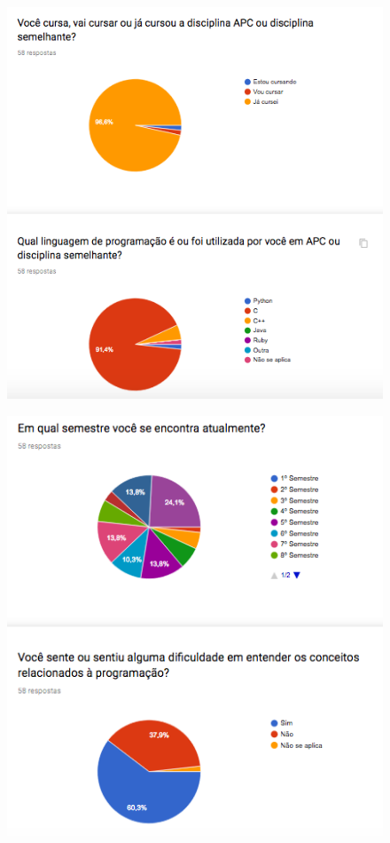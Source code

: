 \begin{apendicesenv}
\begin{figure}[h]
	\centering
	\includegraphics[keepaspectratio=true,scale=0.9]{figuras/r1.png}
\end{figure}

\begin{figure}[h]
	\centering
	\includegraphics[keepaspectratio=true,scale=0.9]{figuras/r2.png}
\end{figure}


\end{apendicesenv}
